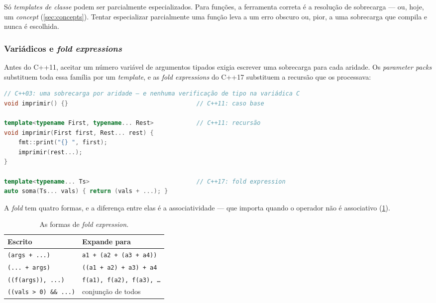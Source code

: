 \begin{armadilha}
Só \emph{templates de classe} podem ser parcialmente especializados. Para
funções, a ferramenta correta é a resolução de sobrecarga --- ou, hoje, um
\emph{concept} (\cref{sec:concepts}). Tentar especializar parcialmente uma
função leva a um erro obscuro ou, pior, a uma sobrecarga que compila e nunca é
escolhida.
\end{armadilha}

\subsubsection{Variádicos e \emph{fold expressions}}

Antes do C++11, aceitar um número variável de argumentos tipados exigia escrever
uma sobrecarga para cada aridade. Os \emph{parameter packs} substituem toda essa
família por um \emph{template}, e as \emph{fold expressions} do C++17
substituem a recursão que os processava:

\begin{lstlisting}[style=bt, language=C++,
    caption={O mesmo problema, em três gerações da linguagem.}]
// C++03: uma sobrecarga por aridade — e nenhuma verificação de tipo na variádica C
void imprimir() {}                                    // C++11: caso base

template<typename First, typename... Rest>            // C++11: recursão
void imprimir(First first, Rest... rest) {
    fmt::print("{} ", first);
    imprimir(rest...);
}

template<typename... Ts>                              // C++17: fold expression
auto soma(Ts... vals) { return (vals + ...); }
\end{lstlisting}

A \emph{fold} tem quatro formas, e a diferença entre elas é a associatividade ---
que importa quando o operador não é associativo (\cref{tab:folds}).

\begin{table}[htbp]
\centering
\caption{As formas de \emph{fold expression}.}
\label{tab:folds}
\footnotesize
\begin{tabular}{@{}ll@{}}
\toprule
\textbf{Escrito} & \textbf{Expande para} \\
\midrule
\texttt{(args + ...)}    & \texttt{a1 + (a2 + (a3 + a4))} \\
\texttt{(... + args)}    & \texttt{((a1 + a2) + a3) + a4} \\
\texttt{((f(args)), ...)}& \texttt{f(a1), f(a2), f(a3), …} \\
\texttt{((vals > 0) \&\& ...)} & conjunção de todos \\
\bottomrule
\end{tabular}
\end{table}

